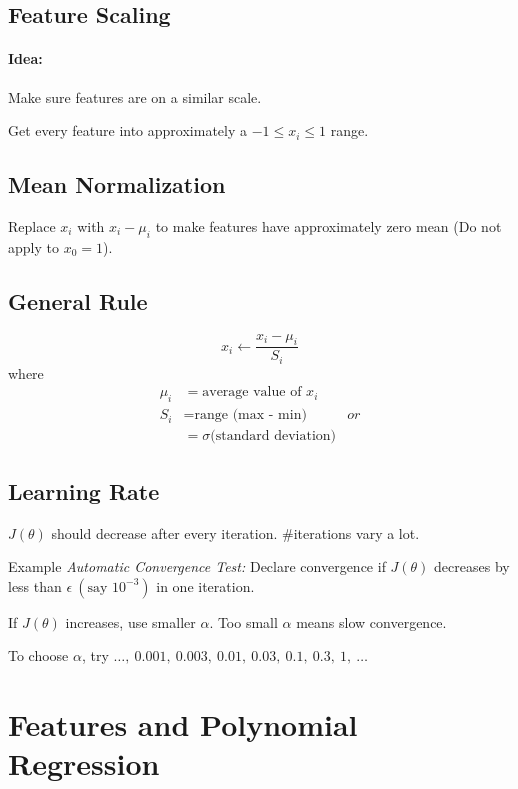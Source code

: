 \subsection{Feature Scaling}
\paragraph{Idea:} Make sure features are on a similar scale.

Get every feature into approximately a $-1 \le x_i \le 1$ range.

\subsection{Mean Normalization}
Replace $x_i$ with $x_i - \mu_i$ to make features have approximately zero mean
(Do not apply to $x_0 = 1$).

\subsection*{General Rule}
\begin{equation*}
    x_i \leftarrow \frac{x_i - \mu_i}{S_i}
\end{equation*}
where
\begin{align*}
    \mu_i & = \text{average value of } x_i            \\
    S_i   & = \text{range (max - min)}           & or \\
          & = \sigma \text{(standard deviation)}
\end{align*}

\subsection{Learning Rate}
$J(\theta)$ should decrease after every iteration. $\#$iterations vary a lot.

Example \emph{Automatic Convergence Test:} Declare convergence if $J(\theta)$
decreases by less than $\epsilon\ (\text{say } 10^{-3})$ in one iteration.

If $J(\theta)$ increases, use smaller $\alpha$. Too small $\alpha$ means slow convergence.

To choose $\alpha$, try $\dots,\ 0.001,\ 0.003,\ 0.01,\ 0.03,\ 0.1,\ 0.3,\ 1,\ \dots$

\section{Features and Polynomial Regression}
